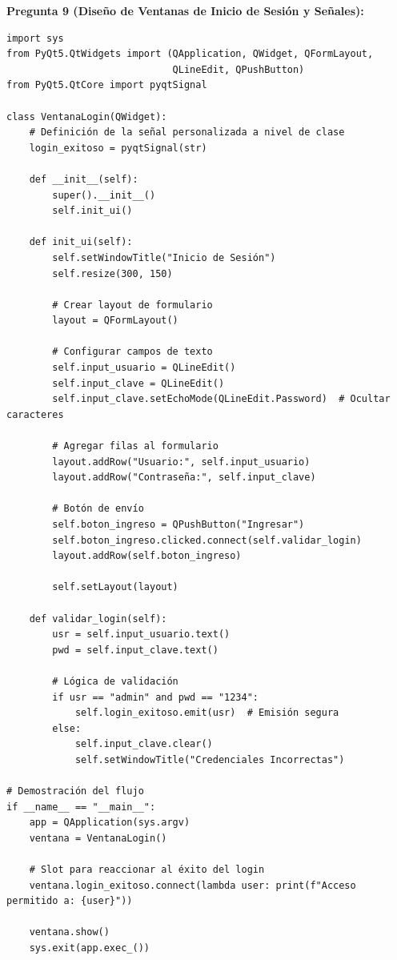 \documentclass[12pt,letterpaper]{article}
\begin{document}
\pagebreak

\textbf{Pregunta 9 (Diseño de Ventanas de Inicio de Sesión y Señales):}
\begin{verbatim}
import sys
from PyQt5.QtWidgets import (QApplication, QWidget, QFormLayout, 
                             QLineEdit, QPushButton)
from PyQt5.QtCore import pyqtSignal

class VentanaLogin(QWidget):
    # Definición de la señal personalizada a nivel de clase
    login_exitoso = pyqtSignal(str)

    def __init__(self):
        super().__init__()
        self.init_ui()

    def init_ui(self):
        self.setWindowTitle("Inicio de Sesión")
        self.resize(300, 150)

        # Crear layout de formulario
        layout = QFormLayout()

        # Configurar campos de texto
        self.input_usuario = QLineEdit()
        self.input_clave = QLineEdit()
        self.input_clave.setEchoMode(QLineEdit.Password)  # Ocultar caracteres

        # Agregar filas al formulario
        layout.addRow("Usuario:", self.input_usuario)
        layout.addRow("Contraseña:", self.input_clave)

        # Botón de envío
        self.boton_ingreso = QPushButton("Ingresar")
        self.boton_ingreso.clicked.connect(self.validar_login)
        layout.addRow(self.boton_ingreso)

        self.setLayout(layout)

    def validar_login(self):
        usr = self.input_usuario.text()
        pwd = self.input_clave.text()

        # Lógica de validación
        if usr == "admin" and pwd == "1234":
            self.login_exitoso.emit(usr)  # Emisión segura
        else:
            self.input_clave.clear()
            self.setWindowTitle("Credenciales Incorrectas")

# Demostración del flujo
if __name__ == "__main__":
    app = QApplication(sys.argv)
    ventana = VentanaLogin()
    
    # Slot para reaccionar al éxito del login
    ventana.login_exitoso.connect(lambda user: print(f"Acceso permitido a: {user}"))
    
    ventana.show()
    sys.exit(app.exec_())
\end{verbatim}
\end{document}
